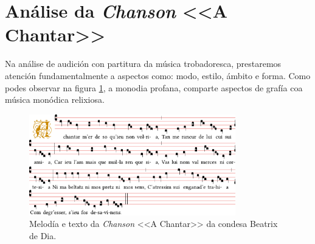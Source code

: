 %
%
\section{Análise da \textit{Chanson} <<A Chantar>>} 
%
Na análise de audición con partitura da música trobadoresca, prestaremos atención fundamentalmente a aspectos como: modo, estilo, ámbito e forma. Como podes observar na figura \ref{fig:a-chantar}, a monodia profana, comparte aspectos de grafía coa música monódica relixiosa.

\par
\vspace*{0.15cm}
%
\begin{figure}[h]
    \centering
    \includegraphics[width=0.80\textwidth]{figures/audicions/A-Chantar.pdf}
    \caption{Melodía e texto da \textit{Chanson} <<A Chantar>> da condesa Beatrix de Dia.}
    \label{fig:a-chantar}
\end{figure}
%
